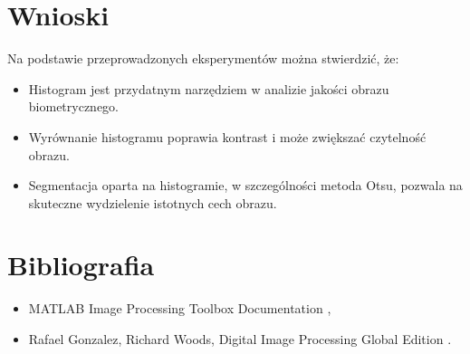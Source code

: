 \section{Wnioski}
Na podstawie przeprowadzonych eksperymentów można stwierdzić, że:
\begin{itemize}
    \item Histogram jest przydatnym narzędziem w analizie jakości obrazu biometrycznego.
    \item Wyrównanie histogramu poprawia kontrast i może zwiększać czytelność obrazu.
    \item Segmentacja oparta na histogramie, w szczególności metoda Otsu, pozwala na skuteczne wydzielenie istotnych cech obrazu.
\end{itemize}

\section{Bibliografia}
\begin{itemize}
    \item MATLAB Image Processing Toolbox Documentation \cite{mathworks},
    \item Rafael Gonzalez, Richard Woods, Digital Image Processing Global Edition \cite{gonzalez2017}.
\end{itemize}
